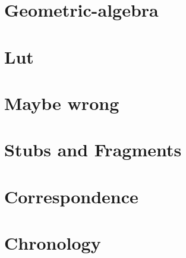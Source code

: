 \documentclass[12pt,leqno]{book}
\begin{document}
\part{Geometric-algebra}







\part{Lut}



\part{Maybe wrong}


\part{Stubs and Fragments}





\part{Correspondence}














\part{Chronology}





\end{document}
